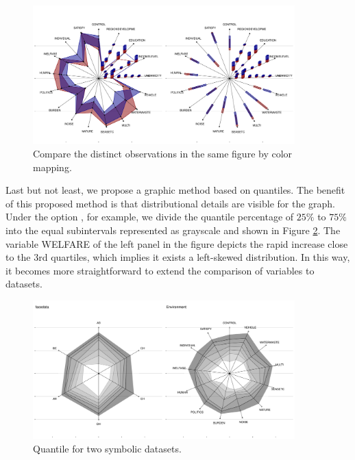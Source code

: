 \documentclass[article]{jss}
\begin{document}
\begin{figure}[htbp]
\centering
\includegraphics[width=0.9\textwidth]{ggESDA_Jiang&Wu_20210915-radar.pdf} 
\caption{\label{fig:radar}  Compare the distinct observations in the same figure by color mapping.}
\end{figure}

Last but not least, we propose a graphic method based on quantiles. The benefit of this proposed method is that distributional details are visible for the graph. Under the option , for example, we divide the quantile percentage of $25\%$ to $75\%$ into the equal subintervals represented as grayscale and shown in Figure \ref{fig:quantile2}. The variable WELFARE of the left panel in the figure depicts the rapid increase close to the 3rd quartiles, which implies it exists a left-skewed distribution. In this way, it becomes more straightforward to extend the comparison of variables to datasets.

\begin{figure}[htbp]
\centering
\includegraphics[width=0.9\textwidth]{radar_2datasets.pdf} 
\caption{\label{fig:quantile2} Quantile for two symbolic datasets.}
\end{figure}

\end{document}

